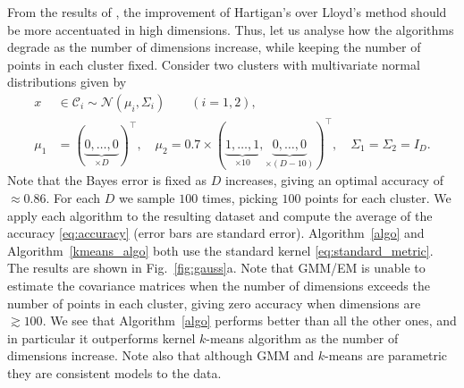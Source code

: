\documentclass[aps,preprint,nofootinbib,floatfix]{revtex4-1}
\newcommand\C{{\mathcal{C}}}
\begin{document}
From the results of \cite{Telgarsky}, the improvement of Hartigan's 
over Lloyd's method should be more accentuated in high dimensions.
Thus, let us analyse
how the algorithms degrade as the number of dimensions increase, while
keeping the number of points in each cluster fixed. Consider
two clusters with multivariate normal distributions given by
\begin{equation}
\label{eq:gauss1}
\begin{split}
x &\in \C_i  \sim 
\mathcal{N}(\mu_i,\Sigma_i) \qquad (i=1,2),  \\
\mu_1 &= (\underbrace{0,\dotsc,0}_{\times D})^\top , \quad
\mu_2 = 0.7 \times (\underbrace{1,\dots,1}_{\times 10},
\underbrace{0,\dots,0}_{\times (D-10)})^\top, \quad
\Sigma_1 = \Sigma_2 = I_D.
\end{split}
\end{equation}
Note that the Bayes error
is fixed as $D$ increases, giving an optimal 
accuracy of $\approx 0.86$.
For each $D$ we sample $100$ times, picking $100$ points for each cluster.
We apply each algorithm to the resulting dataset 
and compute the average of the accuracy \eqref{eq:accuracy} (error bars
are standard error).
Algorithm~\ref{algo} and Algorithm~\ref{kmeans_algo} 
both use the standard
kernel \eqref{eq:standard_metric}.
The results are shown in Fig.~\ref{fig:gauss}a.
Note that GMM/EM is unable to estimate the covariance matrices
when the number of dimensions exceeds the number of points in each cluster,
giving zero accuracy when dimensions are $\gtrsim 100$.
We see that Algorithm~\ref{algo} performs better than all the other ones,
and in particular it outperforms kernel $k$-means algorithm as the number
of dimensions increase. Note also that although GMM and $k$-means are
parametric they are consistent models to the data.
\end{document}
